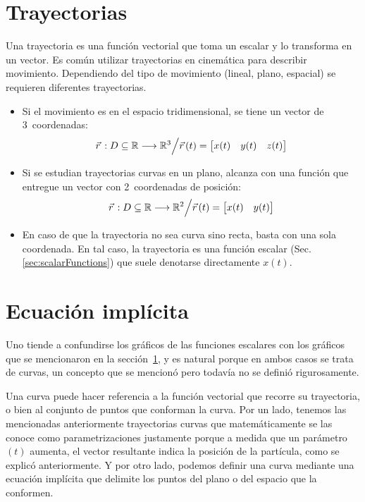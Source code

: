 \documentclass[a5paper,12pt,twoside]{book}
\begin{document}
\begin{center}
    \def\svgwidth{0.8\linewidth}
    
\end{center}


\section{Trayectorias}
\label{A:trajectory}

Una trayectoria es una función vectorial que toma un escalar y lo transforma en un vector.
Es común utilizar trayectorias en cinemática para describir movimiento.
Dependiendo del tipo de movimiento (lineal, plano, espacial) se requieren diferentes trayectorias.
\begin{itemize}
    \item
    Si el movimiento es en el espacio tridimensional, se tiene un vector de 3~coordenadas:
    \[
    \vec{r}\hspace{0.05cm}:D \subseteq \mathbb{R} \longrightarrow \mathbb{R}^3 \Big/ \vec{r}\hspace{0.05cm}(t) =
    \begin{bmatrix} x(t) & y(t) & z(t) \end{bmatrix}
    \]

    \item
    Si se estudian trayectorias curvas en un plano, alcanza con una función que entregue un vector con 2~coordenadas de posición:
    \[
    \vec{r}\hspace{0.05cm}:D \subseteq \mathbb{R} \longrightarrow \mathbb{R}^2 \Big/ \vec{r}\hspace{0.05cm}(t) =
    \begin{bmatrix} x(t) & y(t) \end{bmatrix}
    \]

    \item
    En caso de que la trayectoria no sea curva sino recta, basta con una sola coordenada.
    En tal caso, la trayectoria es una función escalar (Sec. \ref{sec:scalarFunctions}) que suele denotarse directamente $x(t)$.
\end{itemize}


\section{Ecuación implícita}

Uno tiende a confundirse los gráficos de las funciones escalares con los gráficos que se mencionaron en la sección~\ref{A:trajectory}, y es natural porque en ambos casos se trata de curvas, un concepto que se mencionó pero todavía no se definió rigurosamente.

Una curva puede hacer referencia a la función vectorial que recorre su trayectoria, o bien al conjunto de puntos que conforman la curva.
Por un lado, tenemos las mencionadas anteriormente trayectorias curvas que matemáticamente se las conoce como parametrizaciones justamente porque a medida que un parámetro $(t)$ aumenta, el vector resultante indica la posición de la partícula, como se explicó anteriormente.
Y por otro lado, podemos definir una curva mediante una ecuación implícita que delimite los puntos del plano o del espacio que la conformen.
\end{document}
